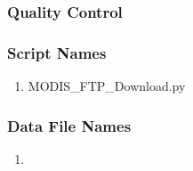 \subsubsection*{Quality Control}
\subsubsection*{Script Names}
\begin{enumerate}
\item MODIS\_FTP\_Download.py
\end{enumerate}
\subsubsection*{Data File Names}
\begin{enumerate}
\item 
\end{enumerate}